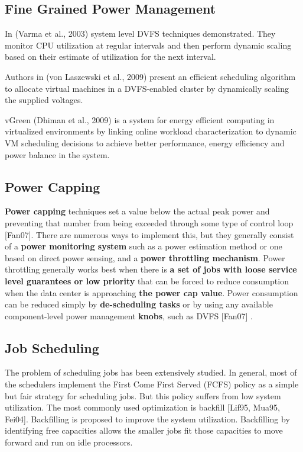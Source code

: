 \documentclass{llncs}
\begin{document}
\subsection{Fine Grained Power Management}
In \cite{varma_control-theoretic_2003} (Varma et al., 2003) system level DVFS techniques demonstrated. They
monitor CPU utilization at regular intervals and then perform dynamic
scaling based on their estimate of utilization for the next interval.

Authors in\cite{von_laszewski_power-aware_2009} (von Laszewski et al., 2009) present an efficient scheduling
algorithm to allocate virtual machines in a DVFS-enabled cluster by
dynamically scaling the supplied voltages.

vGreen \cite{dhiman_vgreen:_2009} (Dhiman et al., 2009) is a system for energy efficient computing in
virtualized environments by linking online workload characterization to
dynamic VM scheduling decisions to achieve better performance, energy
efficiency and power balance in the system.

\subsection{Power Capping}

\textbf{Power capping }techniques set a value below the actual peak power
and preventing that number from being exceeded through some type of control
loop [Fan07]. There are numerous ways to implement this, but they generally
consist of a \textbf{power monitoring system }such as a power estimation
method or one based on direct power sensing, and a \textbf{power throttling
mechanism}. Power throttling generally works best when there is \textbf{a
set of jobs with loose service level guarantees or low priority }that can be
forced to reduce consumption when the data center is approaching \textbf{the
power cap value}. Power consumption can be reduced simply by
\textbf{de-scheduling tasks }or by using any available component-level power
management \textbf{knobs}, such as DVFS [Fan07]
.

\subsection{Job Scheduling}
The problem of scheduling jobs has been extensively studied. In general,
most of the schedulers implement the First Come First Served (FCFS) policy
as a simple but fair strategy for scheduling jobs. But this policy suffers
from low system utilization. The most commonly used optimization is backfill
\cite{lifka_anl/ibm_1995} 
\cite{mualem_utilization_2001}
\cite{feitelson_parallel_2004}
[Lif95, Mua95, Fei04]. Backfilling is proposed to improve the system
utilization. Backfilling by identifying free capacities allows the smaller
jobs fit those capacities to move forward and run on idle processors.
\end{document}
